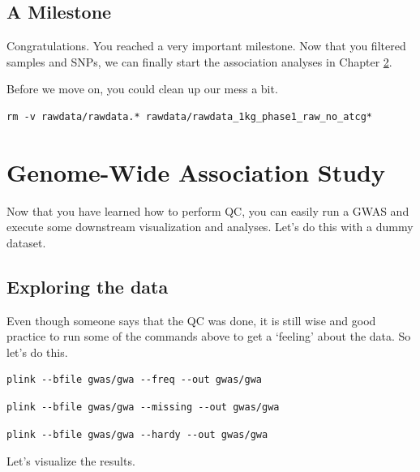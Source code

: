 \documentclass[
]{book}
\begin{document}
\hypertarget{a-milestone}{%
\section{A Milestone}\label{a-milestone}}

Congratulations. You reached a very important milestone. Now that you filtered samples and SNPs, we can finally start the association analyses in Chapter \ref{gwas-testing}.

Before we move on, you could clean up our mess a bit.

\begin{verbatim}
rm -v rawdata/rawdata.* rawdata/rawdata_1kg_phase1_raw_no_atcg*
\end{verbatim}

\hypertarget{gwas-testing}{%
\chapter{Genome-Wide Association Study}\label{gwas-testing}}

Now that you have learned how to perform QC, you can easily run a GWAS and execute some downstream visualization and analyses. Let's do this with a dummy dataset.

\hypertarget{exploring-the-data}{%
\section{Exploring the data}\label{exploring-the-data}}

Even though someone says that the QC was done, it is still wise and good practice to run some of the commands above to get a `feeling' about the data. So let's do this.

\begin{verbatim}
plink --bfile gwas/gwa --freq --out gwas/gwa
\end{verbatim}

\begin{verbatim}
plink --bfile gwas/gwa --missing --out gwas/gwa
\end{verbatim}

\begin{verbatim}
plink --bfile gwas/gwa --hardy --out gwas/gwa
\end{verbatim}

Let's visualize the results.
\end{document}

